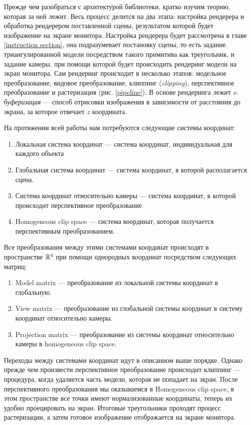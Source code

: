 \documentclass{article}
\begin{document}
Прежде чем разобраться с архитектурой библиотеки, кратко изучим теорию, которая за ней лежит.
Весь процесс делится на два этапа: настройка рендерера и обработка рендерером поставленной сцены, результатом которой будет изображение на экране монитора.
Настройка рендерера будет рассмотрена в главе \ref{instruction section}, она подразумевает постановку сцены, то есть задание триангулированной модели посредством такого примитива как треугольник, и задание камеры, при помощи которой будет происходить рендеринг модели на экран монитора.
Сам рендеринг происходит в несколько этапов: модельное преобразование, видовое преобразование, клиппинг (\emph{clipping}), перспективное преобразование и растеризация (рис. \ref{pipeline}).
В основе рендеринга лежит \emph{z-буферизация} --- способ отрисовки изображения в зависимости от расстояния до экрана, за которое отвечает $z$ координата.

На протяжении всей работы нам потребуются следующие системы координат:

\begin{enumerate}
	\item Локальная система координат --- система координат, индивидуальная для каждого объекта
	\item Глобальная система координат --- система координат, в которой располагается сцена.
	\item Система координат относительно камеры --- система координат, в которой происходит перспективное преобразование.
	\item Homogeneous clip space --- система координат, которая получается перспективным преобразованием.
\end{enumerate}

Все преобразования между этими системами координат происходят в пространстве $\mathbb{R}^{4}$ при помощи однородных координат посредством следующих матриц:

\begin{enumerate}
	\item Model matrix --- преобразование из локальной системы координат в глобальную.
	\item View matrix --- преобразование из глобальной системы координат в систему координат относительно камеры.
	\item Projection matrix --- преобразование из системы координат относительно камеры в homogeneous clip space.
\end{enumerate}

Переходы между системами координат идут в описанном выше порядке.
Однако прежде чем произвести перспективное преобразование происходит клиппинг --- процедура, когда удаляется часть модели, которая не попадает на экран.
После перспективного преобразования мы оказываемся в Homogeneous clip space, в этом пространстве все точки имеют нормализованные координаты, теперь их удобно проецировать на экран.
Итоговые треугольники проходят процесс растеризации, а затем готовое изображение отображается на экране монитора.
\end{document}
